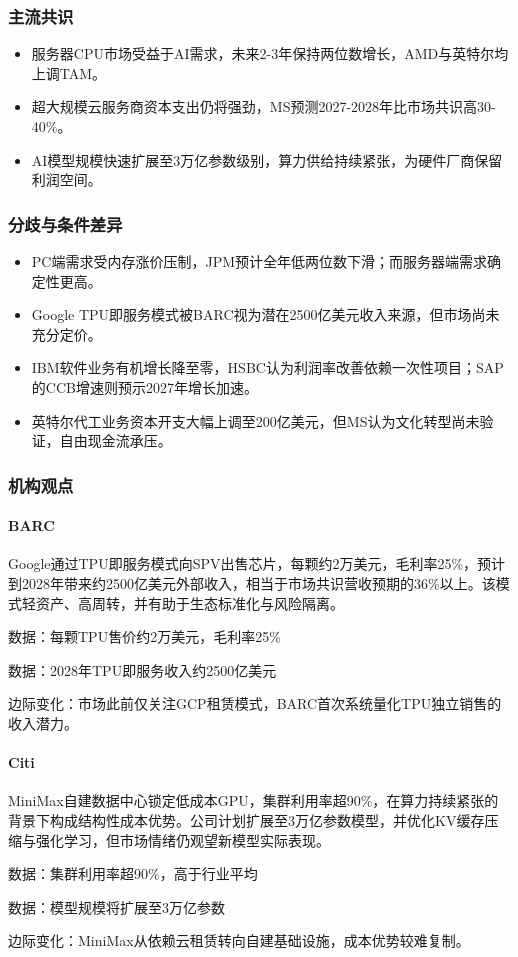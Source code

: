 \documentclass[11pt]{ctexart}
\begin{document}
\subsubsection*{主流共识}
\begin{itemize}
  \item 服务器CPU市场受益于AI需求，未来2-3年保持两位数增长，AMD与英特尔均上调TAM。
  \item 超大规模云服务商资本支出仍将强劲，MS预测2027-2028年比市场共识高30-40\%。
  \item AI模型规模快速扩展至3万亿参数级别，算力供给持续紧张，为硬件厂商保留利润空间。
\end{itemize}
\subsubsection*{分歧与条件差异}
\begin{itemize}
  \item PC端需求受内存涨价压制，JPM预计全年低两位数下滑；而服务器端需求确定性更高。
  \item Google TPU即服务模式被BARC视为潜在2500亿美元收入来源，但市场尚未充分定价。
  \item IBM软件业务有机增长降至零，HSBC认为利润率改善依赖一次性项目；SAP的CCB增速则预示2027年增长加速。
  \item 英特尔代工业务资本开支大幅上调至200亿美元，但MS认为文化转型尚未验证，自由现金流承压。
\end{itemize}
\subsubsection*{机构观点}
\paragraph{BARC} Google通过TPU即服务模式向SPV出售芯片，每颗约2万美元，毛利率25\%，预计到2028年带来约2500亿美元外部收入，相当于市场共识营收预期的36\%以上。该模式轻资产、高周转，并有助于生态标准化与风险隔离。
{\small\color{refgray}数据：每颗TPU售价约2万美元，毛利率25\%\par}
{\small\color{refgray}数据：2028年TPU即服务收入约2500亿美元\par}
{\small\color{refgray}边际变化：市场此前仅关注GCP租赁模式，BARC首次系统量化TPU独立销售的收入潜力。\par}
\paragraph{Citi} MiniMax自建数据中心锁定低成本GPU，集群利用率超90\%，在算力持续紧张的背景下构成结构性成本优势。公司计划扩展至3万亿参数模型，并优化KV缓存压缩与强化学习，但市场情绪仍观望新模型实际表现。
{\small\color{refgray}数据：集群利用率超90\%，高于行业平均\par}
{\small\color{refgray}数据：模型规模将扩展至3万亿参数\par}
{\small\color{refgray}边际变化：MiniMax从依赖云租赁转向自建基础设施，成本优势较难复制。\par}
\end{document}
